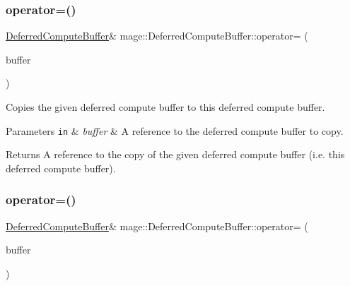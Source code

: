\subsubsection{\texorpdfstring{operator=()}{operator=()}\hspace{0.1cm}{\footnotesize\ttfamily [1/2]}}
{\footnotesize\ttfamily \hyperlink{structmage_1_1_deferred_compute_buffer}{Deferred\+Compute\+Buffer}\& mage\+::\+Deferred\+Compute\+Buffer\+::operator= (\begin{DoxyParamCaption}\item[{const \hyperlink{structmage_1_1_deferred_compute_buffer}{Deferred\+Compute\+Buffer} \&}]{buffer }\end{DoxyParamCaption})\hspace{0.3cm}{\ttfamily [default]}}

Copies the given deferred compute buffer to this deferred compute buffer.


\begin{DoxyParams}[1]{Parameters}
\mbox{\tt in}  & {\em buffer} & A reference to the deferred compute buffer to copy. \\
\hline
\end{DoxyParams}
\begin{DoxyReturn}{Returns}
A reference to the copy of the given deferred compute buffer (i.\+e. this deferred compute buffer). 
\end{DoxyReturn}
\hypertarget{structmage_1_1_deferred_compute_buffer_aba88894e51c04f27b75b5c355a39d31a}{}\label{structmage_1_1_deferred_compute_buffer_aba88894e51c04f27b75b5c355a39d31a} 
\subsubsection{\texorpdfstring{operator=()}{operator=()}\hspace{0.1cm}{\footnotesize\ttfamily [2/2]}}
{\footnotesize\ttfamily \hyperlink{structmage_1_1_deferred_compute_buffer}{Deferred\+Compute\+Buffer}\& mage\+::\+Deferred\+Compute\+Buffer\+::operator= (\begin{DoxyParamCaption}\item[{\hyperlink{structmage_1_1_deferred_compute_buffer}{Deferred\+Compute\+Buffer} \&\&}]{buffer }\end{DoxyParamCaption})\hspace{0.3cm}{\ttfamily [default]}}

